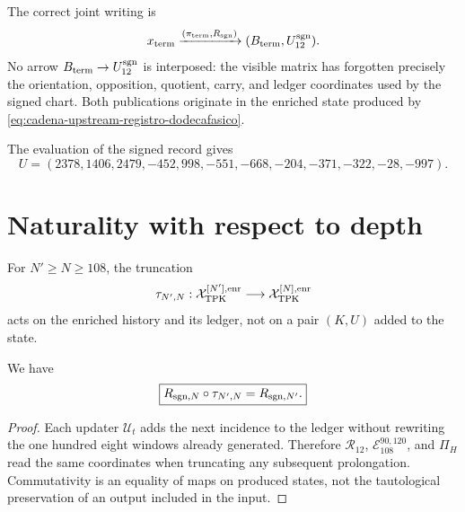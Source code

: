 The correct joint writing is
\begin{equation}
 x_{\rm term}
 \xrightarrow{(\pi_{\rm term},R_{\rm sgn})}
 (B_{\rm term},U_{12}^{\rm sgn}).
 \label{eq:doble-publicacion-terminal}
\end{equation}
No arrow \(B_{\rm term}\to U_{12}^{\rm sgn}\) is interposed: the visible matrix has forgotten precisely the orientation, opposition, quotient, carry, and ledger coordinates used by the signed chart. Both publications originate in the enriched state produced by \eqref{eq:cadena-upstream-registro-dodecafasico}.

The evaluation of the signed record gives
\begin{equation}
 \boxed{
 U=(2378,1406,2479,-452,998,-551,
 -668,-204,-371,-322,-28,-997).}
 \label{eq:vector-u-firmado-autonomo}
\end{equation}

\section{Naturality with respect to depth}

For \(N'\geq N\geq108\), the truncation
\begin{equation}
 \tau_{N',N}:
 \mathcal X_{\rm TPK}^{[N'],\rm enr}
 \longrightarrow\mathcal X_{\rm TPK}^{[N],\rm enr}
 \label{eq:truncamiento-preserva-ku-autonomo}
\end{equation}
acts on the enriched history and its ledger, not on a pair \((K,U)\) added to the state.

\begin{theorem}
\label{thm:naturalidad-lector-firmado-autonomo}
We have
\begin{equation}
 \boxed{
 R_{{\rm sgn},N}\circ\tau_{N',N}
 =R_{{\rm sgn},N'}.}
 \label{eq:cuadrado-naturalidad-lector-firmado}
\end{equation}
\end{theorem}

\begin{proof}
Each updater \(\mathcal U_t\) adds the next incidence to the ledger without rewriting the one hundred eight windows already generated. Therefore \(\mathcal R_{12}\), \(\mathcal E_{108}^{90,120}\), and \(\Pi_H\) read the same coordinates when truncating any subsequent prolongation. Commutativity is an equality of maps on produced states, not the tautological preservation of an output included in the input.
\end{proof}

